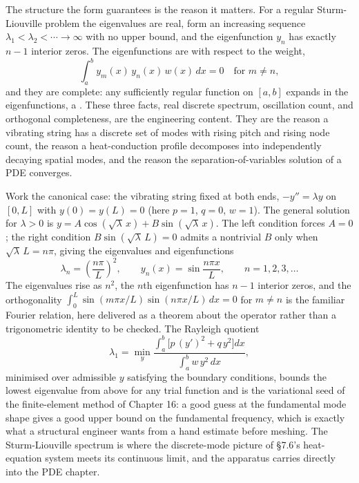 The structure the form guarantees is the reason it matters. For a
regular Sturm-Liouville problem the eigenvalues are real, form an
increasing sequence $\lambda_{1} < \lambda_{2} < \cdots \to \infty$
with no upper bound, and the eigenfunction $y_{n}$ has exactly $n - 1$
interior zeros. The eigenfunctions are  with
respect to the weight,
\[
\int_{a}^{b} y_{m}(x)\, y_{n}(x)\, w(x)\, dx = 0
\quad\text{for } m \neq n,
\]
and they are complete: any sufficiently regular function on $[a, b]$
expands in the eigenfunctions, a .
These three facts, real discrete spectrum, oscillation count, and
orthogonal completeness, are the engineering content. They are the
reason a vibrating string has a discrete set of modes with rising
pitch and rising node count, the reason a heat-conduction profile
decomposes into independently decaying spatial modes, and the reason
the separation-of-variables solution of a PDE converges.

Work the canonical case: the vibrating string fixed at both ends,
$-y'' = \lambda y$ on $[0, L]$ with $y(0) = y(L) = 0$ (here $p = 1$,
$q = 0$, $w = 1$). The general solution for $\lambda > 0$ is
$y = A\cos(\sqrt{\lambda}\,x) + B\sin(\sqrt{\lambda}\,x)$. The left
condition forces $A = 0$; the right condition $B\sin(\sqrt{\lambda}\,L)
= 0$ admits a nontrivial $B$ only when $\sqrt{\lambda}\,L = n\pi$,
giving the eigenvalues and eigenfunctions
\[
\lambda_{n} = \left(\frac{n\pi}{L}\right)^{2}, \qquad
y_{n}(x) = \sin\!\frac{n\pi x}{L}, \qquad n = 1, 2, 3, \ldots
\]
The eigenvalues rise as $n^{2}$, the $n$th eigenfunction has $n - 1$
interior zeros, and the orthogonality $\int_{0}^{L}\sin(m\pi x/L)
\sin(n\pi x/L)\,dx = 0$ for $m \neq n$ is the familiar Fourier
relation, here delivered as a theorem about the operator rather than a
trigonometric identity to be checked. The Rayleigh quotient
\[
\lambda_{1} = \min_{y}\frac{\int_{a}^{b}\bigl[p\,(y')^{2} +
q\,y^{2}\bigr]dx}{\int_{a}^{b} w\,y^{2}\,dx},
\]
minimised over admissible $y$ satisfying the boundary conditions,
bounds the lowest eigenvalue from above for any trial function and is
the variational seed of the finite-element method of Chapter 16: a
good guess at the fundamental mode shape gives a good upper bound on
the fundamental frequency, which is exactly what a structural engineer
wants from a hand estimate before meshing. The Sturm-Liouville
spectrum is where the discrete-mode picture of \S7.6's heat-equation
system meets its continuous limit, and the apparatus carries directly
into the PDE chapter.


